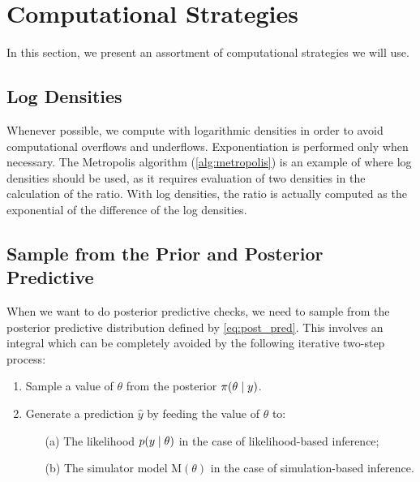 \section{Computational Strategies}

In this section, we present an assortment of computational strategies we will use. 



\subsection{Log Densities}

Whenever possible, we compute with logarithmic densities in order to avoid computational overflows and underflows. Exponentiation is performed only when necessary. The Metropolis algorithm (\cref{alg:metropolis}) is an example of where log densities should be used, as it requires evaluation of two densities in the calculation of the ratio. With log densities, the ratio is actually computed as the exponential of the difference of the log densities.   


\subsection{Sample from the Prior and Posterior Predictive} 

When we want to do posterior predictive checks, we need to sample from the posterior predictive distribution defined by \autoref{eq:post_pred}. This involves an integral which can be completely avoided by the following iterative two-step process:
\begin{enumerate}
    \item Sample a value of $\theta$ from the posterior $\pi \qty(\theta \mid y)$. 
    \item Generate a prediction $\hat{y}$ by feeding the value of $\theta$ to:
    \begin{itemize}
        \item[(a)] The likelihood $p \qty(y \mid \theta)$ in the case of likelihood-based inference;
        \item[(b)] The simulator model $\mathrm{M}(\theta)$ in the case of simulation-based inference. 
    \end{itemize}
\end{enumerate}

